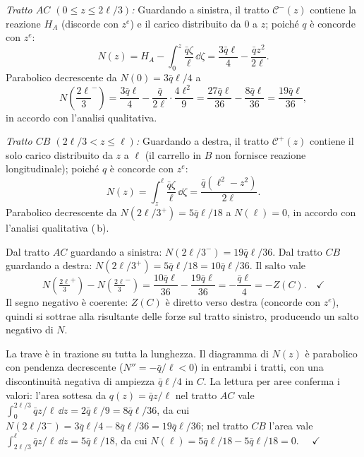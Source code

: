 \begin{esempio}
\begin{svolgimento}
		
		\textit{Tratto $AC$ $(0 \leq z \leq 2\ell/3)$:}
		Guardando a sinistra, il tratto $\mathcal{C}^-(z)$ contiene
		la reazione $H_A$ (discorde con $z^e$) e il carico distribuito
		da $0$ a $z$; poiché $q$ è concorde con $z^e$:
		\[
		N(z) = H_A - \int_0^z \frac{\bar{q}\zeta}{\ell}\,\dd\zeta
		= \frac{3\bar{q}\ell}{4} - \frac{\bar{q}z^2}{2\ell}.
		\]
		Parabolico decrescente  da
		$N(0) = 3\bar{q}\ell/4$ a
		\[
		N\!\left(\frac{2\ell}{3}^-\right)
		= \frac{3\bar{q}\ell}{4} - \frac{\bar{q}}{2\ell}\cdot\frac{4\ell^2}{9}
		= \frac{27\bar{q}\ell}{36} - \frac{8\bar{q}\ell}{36}
		= \frac{19\bar{q}\ell}{36},
		\]
		in accordo con l'analisi qualitativa.
		
		\textit{Tratto $CB$ $(2\ell/3 < z \leq \ell)$:}
		Guardando a destra, il tratto $\mathcal{C}^+(z)$ contiene il
		solo carico distribuito da $z$ a $\ell$
		(il carrello in $B$ non fornisce reazione longitudinale);
		poiché $q$ è concorde con $z^e$:
		\[
		N(z) = \int_z^\ell \frac{\bar{q}\zeta}{\ell}\,\dd\zeta
		= \frac{\bar{q}(\ell^2 - z^2)}{2\ell}.
		\]
		Parabolico decrescente  da
		$N(2\ell/3^+) = 5\bar{q}\ell/18$
		a $N(\ell) = 0$, in accordo con l'analisi qualitativa (\,b).
		
		Dal tratto $AC$ guardando a sinistra:
		$N(2\ell/3^-) = 19\bar{q}\ell/36$.
		Dal tratto $CB$ guardando a destra:
		$N(2\ell/3^+) = 5\bar{q}\ell/18 = 10\bar{q}\ell/36$.
		Il salto vale
		\[
		N\!\left(\tfrac{2\ell}{3}^+\right) - N\!\left(\tfrac{2\ell}{3}^-\right)
		= \frac{10\bar{q}\ell}{36} - \frac{19\bar{q}\ell}{36}
		= -\frac{\bar{q}\ell}{4} = -Z(C). \quad\checkmark
		\]
		Il segno negativo è coerente: $Z(C)$ è diretto verso destra
		(concorde con $z^e$), quindi si sottrae alla risultante delle
		forze sul tratto sinistro, producendo un salto negativo di $N$.
		
		\noindent
		La trave è in trazione su tutta la lunghezza.
		Il diagramma di $N(z)$ è parabolico con pendenza
		decrescente ($N'' = -\bar{q}/\ell < 0$) in
		entrambi i tratti, con una discontinuità negativa
		di ampiezza $\bar{q}\ell/4$ in $C$.
		La lettura per aree conferma i valori: l'area
		sottesa da $q(z) = \bar{q}z/\ell$ nel tratto
		$AC$ vale $\int_0^{2\ell/3}\bar{q}z/\ell\,\dd z =
		2\bar{q}\ell/9 = 8\bar{q}\ell/36$, da cui
		$N(2\ell/3^-) = 3\bar{q}\ell/4 - 8\bar{q}\ell/36
		= 19\bar{q}\ell/36$; nel tratto $CB$ l'area vale
		$\int_{2\ell/3}^\ell\bar{q}z/\ell\,\dd z =
		5\bar{q}\ell/18$, da cui
		$N(\ell) = 5\bar{q}\ell/18 - 5\bar{q}\ell/18 = 0$.
		$\quad\checkmark$
		
	\end{svolgimento}
\end{esempio}





